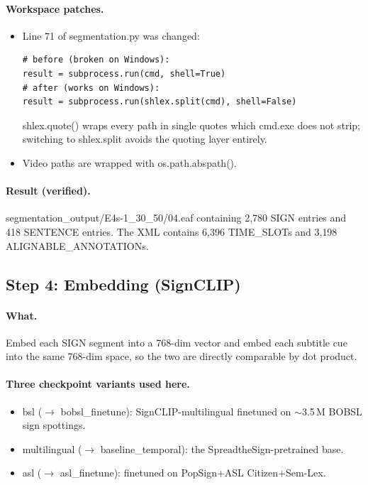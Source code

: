 \documentclass[11pt,a4paper]{article}
\def\texttt#1{#1}%
\def\textbf#1{#1}%
\def\emph#1{#1}%
\begin{document}
\paragraph{Workspace patches.}
\begin{itemize}[leftmargin=1.5em]
  \item Line 71 of \texttt{segmentation.py} was changed:
\begin{lstlisting}
# before (broken on Windows):
result = subprocess.run(cmd, shell=True)
# after (works on Windows):
result = subprocess.run(shlex.split(cmd), shell=False)
\end{lstlisting}
        \texttt{shlex.quote()} wraps every path in single quotes which
        \texttt{cmd.exe} does not strip; switching to \texttt{shlex.split}
        avoids the quoting layer entirely.
  \item Video paths are wrapped with \texttt{os.path.abspath()}.
\end{itemize}

\paragraph{Result (verified).}
\texttt{segmentation\_output/E4s-1\_30\_50/04.eaf} containing
\textbf{2{,}780} \texttt{SIGN} entries and \textbf{418} \texttt{SENTENCE}
entries. The XML contains 6{,}396 \texttt{TIME\_SLOT}s and 3{,}198
\texttt{ALIGNABLE\_ANNOTATION}s.


\subsection{Step 4: Embedding (SignCLIP)}
\label{sec:step4}

\paragraph{What.} Embed each \texttt{SIGN} segment into a 768-dim vector and
embed each subtitle cue into the \emph{same} 768-dim space, so the two are
directly comparable by dot product.

\paragraph{Three checkpoint variants used here.}
\begin{itemize}[leftmargin=1.5em]
  \item \texttt{bsl} ($\to$ \texttt{bobsl\_finetune}): SignCLIP-multilingual
        finetuned on $\sim$3.5\,M BOBSL sign spottings.
  \item \texttt{multilingual} ($\to$ \texttt{baseline\_temporal}): the
        SpreadtheSign-pretrained base.
  \item \texttt{asl} ($\to$ \texttt{asl\_finetune}): finetuned on
        PopSign+ASL Citizen+Sem-Lex.
\end{itemize}
\end{document}

